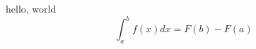\documentclass{article}
\begin{document}
	hello, world
\begin{equation}
    \int_{a}^{b} f(x) dx = F(b) - F(a)
\end{equation}
\end{document}
